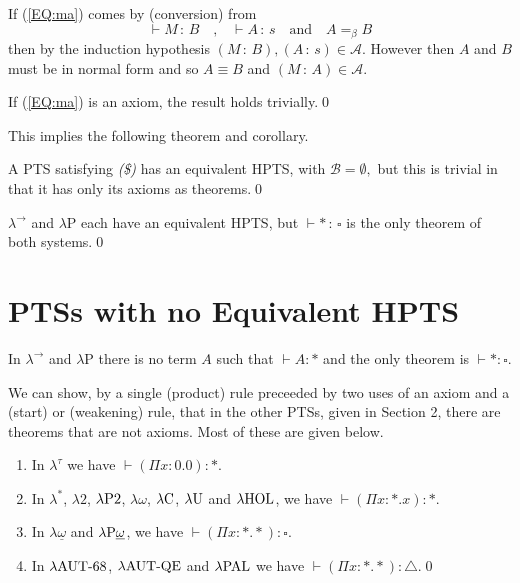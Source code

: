 \documentclass{LMCS}
\def\rbox#1{\mbox{\rm #1}}
\def\:{\mathbin{\,:\,}}
\begin{document}
  If (\ref{EQ:ma}) comes by (conversion) from
\[\vdash M\:B\quad\mbox{,}\quad\vdash A\:s
                 \quad\mbox{and}\quad A=_\beta B
\]
  then by the induction hypothesis $(M\:B), (A\:s)\in{\mathcal A}$.
  However then $A$ and $B$ must be in normal form and so $A\equiv B$
  and $(M\:A)\in{\mathcal A}$.

  If (\ref{EQ:ma}) is an axiom, the result holds trivially.\qed

  This implies the following theorem and corollary.

\begin{thm}\label{T:nine} 
  A PTS satisfying  \emph{(\$)} has an equivalent HPTS, with
  $\mathcal B =\emptyset,$ but this is trivial in that it has only
  its axioms as theorems.\qed
\end{thm}


\begin{cor}\label{C:ten}
  $\lambda^{\rightarrow}$ and $\lambda $P each have an equivalent
  HPTS, but $\vdash\ast\:\square$ is the only theorem of both
  systems.\qed
\end{cor}

\section{PTSs with no Equivalent HPTS}\label{S:PTSnoHPTS}

 \noindent In $\lambda^{\rightarrow}$ and $\lambda$P there is no term
  $A$ such that $\vdash A:\ast$ and the only theorem is $\vdash\ast :
 \square$.

  We can show, by a single (product) rule preceeded by two uses of an
  axiom and a (start) or (weakening) rule, that in the other PTSs,
  given in Section 2, there are theorems that are not axioms. Most of
  these are given below.

\begin{lem}\label{L:eleven}\hfill

\begin{enumerate}[\em(i)]
\item In $\lambda^\tau$  we have $\vdash(\Pi x{:}0.0):\ast$.
\item In $\lambda^\ast$, $\lambda2$, $\lambda\rbox{P2}$, $\lambda\omega$,
  $\lambda\rbox{C}$, $\lambda\rbox{U}$ and $\lambda\rbox{HOL}$, we have
  $\vdash(\Pi x{:}\ast.x):\ast$.
\item In $\lambda\underline{\omega}$ and
  $\lambda\rbox{P}\underline{\omega}$, we have
  $\vdash (\Pi x{:}\ast.\ast):\square$.
\item In $\lambda\rbox{AUT-68}$, $\lambda\rbox{AUT-QE}$ and
  $\lambda\rbox{PAL}$ we have
  $\vdash (\Pi x{:}\ast.\ast):\triangle$.\qed
\end{enumerate}
\end{lem}
\end{document}
